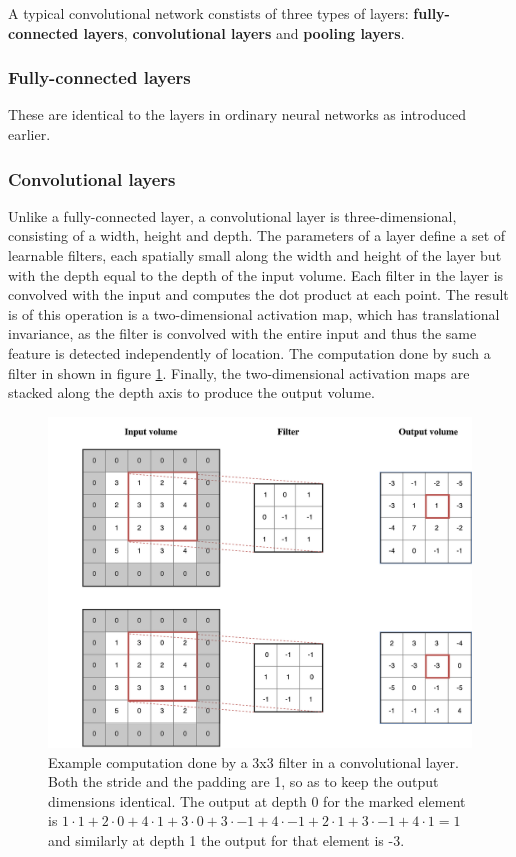 \documentclass[12pt,a4paper,twoside,openright]{report}
\begin{document}
A typical convolutional network constists of three types of layers: \textbf{fully-connected layers}, \textbf{convolutional layers} and \textbf{pooling layers}.

\subsubsection{Fully-connected layers}
These are identical to the layers in ordinary neural networks as introduced earlier.

\subsubsection{Convolutional layers}
Unlike a fully-connected layer, a convolutional layer is three-dimensional, consisting of a width, height and depth. The parameters of a layer define a set of learnable filters, each spatially small along the width and height of the layer but with the depth equal to the depth of the input volume. Each filter in the layer is convolved with the input and computes the dot product at each point. The result is of this operation is a two-dimensional activation map, which has translational invariance, as the filter is convolved with the entire input and thus the same feature is detected independently of location. The computation done by such a filter in shown in figure \ref{fig:conv_example}. Finally, the two-dimensional activation maps are stacked along the depth axis to produce the output volume.

\begin{figure}
	\centering
	\includegraphics[scale=0.6]{conv_example}
	\caption[Example computation done by a 3x3 filter in a convolutional layer]{Example computation done by a 3x3 filter in a convolutional layer. Both the stride and the padding are 1, so as to keep the output dimensions identical. The output at depth 0 for the marked element is $1 \cdot 1 + 2 \cdot 0 + 4 \cdot 1 + 3 \cdot 0 + 3 \cdot -1 + 4 \cdot -1 + 2 \cdot 1 + 3 \cdot -1 + 4 \cdot 1 = 1$ and similarly at depth 1 the output for that element is -3.}
	\label{fig:conv_example}
\end{figure}
\end{document}
